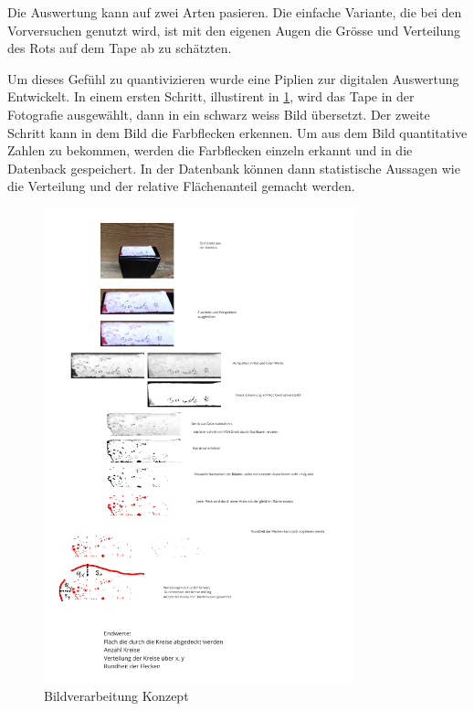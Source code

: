 Die Auswertung kann auf zwei Arten pasieren. Die einfache Variante, die bei den Vorversuchen genutzt wird, ist mit den eigenen Augen die Grösse und Verteilung des Rots auf dem Tape ab zu schätzten.

Um dieses Gefühl zu quantivizieren wurde eine Piplien zur digitalen Auswertung Entwickelt. In einem ersten Schritt, illustirent in \ref{fig:Bildverarbeitnugskonzpet}, wird das Tape in der Fotografie ausgewählt, dann in ein schwarz weiss Bild übersetzt. Der zweite Schritt kann in dem Bild die Farbflecken erkennen. Um aus dem Bild quantitative Zahlen zu bekommen, werden die Farbflecken einzeln erkannt und in die Datenback gespeichert. In der Datenbank können dann statistische Aussagen wie die Verteilung und der relative Flächenanteil gemacht werden.

\begin{figure}
    \centering
    \includegraphics[width=0.8\textwidth]{Bilder/Screenshotfrom2024-04-0112-59-42.png}
    \caption{Bildverarbeitung Konzept}
    \label{fig:Bildverarbeitnugskonzpet}
\end{figure}

\newpage

